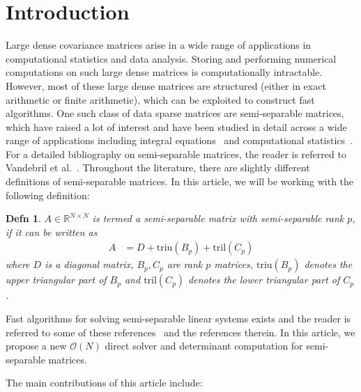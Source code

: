 \documentclass[final,leqno]{siamltex}
\newtheorem{defn}[theorem]{Defn}
\begin{document}
\section{Introduction}
Large dense covariance matrices arise in a wide range of applications in computational statistics and data analysis. Storing and performing numerical computations on such large dense matrices is computationally intractable. However, most of these large dense matrices are structured (either in exact arithmetic or finite arithmetic), which can be exploited to construct fast algorithms. One such class of data sparse matrices are semi-separable matrices, which have raised a lot of interest and have been studied in detail across a wide range of applications including integral equations~\cite{asplund1959finite,gohberg1984non,gesztesy2003modified} and computational statistics~\cite{roy1956inverting,roy1960evaluation,mustafi1967inverse,uppuluri1969inverse, greenberg1959matrix}. For a detailed bibliography on semi-separable matrices, the reader is referred to Vandebril et al.~\cite{vandebril2005bibliography}. Throughout the literature, there are slightly different definitions of semi-separable matrices. In this article, we will be working with the following definition:
\begin{defn}
$A \in \mathbb{R}^{N \times N}$ is termed a semi-separable matrix with semi-separable rank $p$, if it can be written as
\begin{align}
A & = D + \text{triu}(B_p) + \text{tril}(C_p)
\end{align}
where $D$ is a diagonal matrix, $B_p, C_p$ are rank $p$ matrices, $\text{triu}(B_p)$ denotes the upper triangular part of $B_p$ and $\text{tril}(C_p)$ denotes the lower triangular part of $C_p$.
\end{defn}

Fast algorithms for solving semi-separable linear systems exists and the reader is referred to some of these references~\cite{eidelman2002modification,van2004two,eidelman1997inversion,gohberg1985linear, jain2010n,chandrasekaran2003fast} and the references therein. In this article, we propose a new $\mathcal{O}(N)$ direct solver and determinant computation for semi-separable matrices.

The main contributions of this article include:
\end{document}
